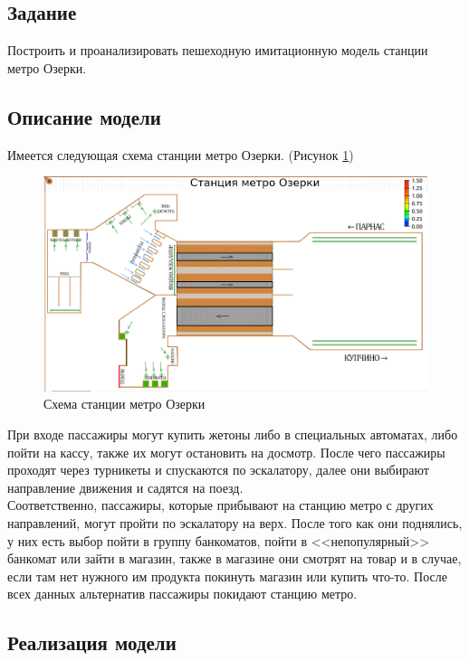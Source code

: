 \documentclass[14pt,fleqn]{extarticle}
\begin{document}
	\subsection*{Задание}
	Построить и проанализировать пешеходную имитационную модель станции метро Озерки.

	\subsection*{Описание модели}
	Имеется следующая схема станции метро Озерки. (Рисунок \ref{fig:metro_plan})
	\begin{figure}[h]
		\centering \includegraphics[scale=0.5]{metro_plan}
		\caption{Схема станции метро Озерки}
		\label{fig:metro_plan}
	\end{figure}
	
	При входе пассажиры могут купить жетоны либо в специальных автоматах, либо пойти на кассу, также их могут остановить на досмотр. После чего пассажиры проходят через турникеты и спускаются по эскалатору, далее они выбирают направление движения и садятся на поезд.\\
	
	Соответственно, пассажиры, которые прибывают на станцию метро с других направлений, могут пройти по эскалатору на верх. После того как они поднялись, у них есть выбор пойти в группу банкоматов, пойти в <<непопулярный>> банкомат или зайти в магазин, также в магазине они смотрят на товар и в случае, если там нет нужного им продукта покинуть магазин или купить что-то. После всех данных альтернатив пассажиры покидают станцию метро.
	
	\newpage
	
	\subsection*{Реализация модели}
	
\end{document}
